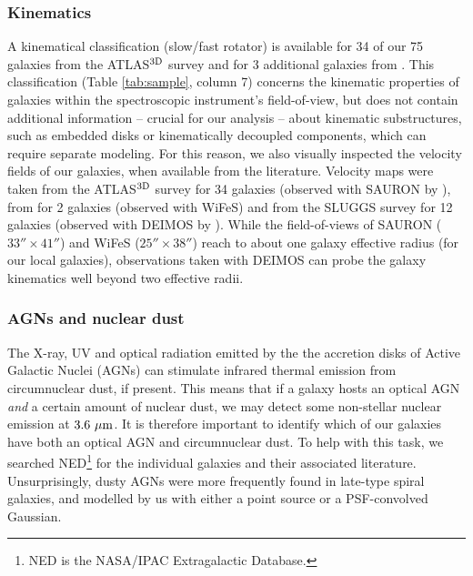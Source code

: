 \documentclass[preprint2]{emulateapj}
\begin{document}
\subsubsection{Kinematics}
\label{sec:kinem}
A kinematical classification (slow/fast rotator) is available for 34 of our 75 galaxies 
from the ATLAS$^{\rm 3D}$ survey \citep{atlas3dIII} 
and for 3 additional galaxies from \citet{scott2014}.
This classification (Table \ref{tab:sample}, column 7) 
concerns the kinematic properties of galaxies within the spectroscopic instrument's field-of-view, 
but does not contain additional information -- crucial for our analysis -- about kinematic substructures, 
such as embedded disks or kinematically decoupled components, 
which can require separate modeling.
For this reason, we also visually inspected the velocity fields of our galaxies, 
when available from the literature.
Velocity maps were taken from the ATLAS$^{\rm 3D}$ survey for 34 galaxies 
(observed with SAURON by \citealt{krajnovic2011}),
from \citet{scott2014} for 2 galaxies 
(observed with WiFeS)
and from the SLUGGS survey for 12 galaxies 
(observed with DEIMOS by \citealt{arnold2014}).
While the field-of-views of SAURON ($33'' \times 41''$) and WiFeS ($25'' \times 38''$) 
reach to about one galaxy effective radius (for our local galaxies),
observations taken with DEIMOS can probe the galaxy kinematics well beyond two effective radii.

\subsubsection{AGNs and nuclear dust}
The X-ray, UV and optical radiation 
emitted by the the accretion disks of Active Galactic Nuclei (AGNs) can stimulate infrared thermal emission 
from circumnuclear dust, if present. 
This means that if a galaxy hosts an optical AGN \emph{and} a certain amount of nuclear dust,
we may detect some non-stellar nuclear emission at $3.6~\rm \mu m$.
It is therefore important to identify which of our galaxies have both an optical AGN and circumnuclear dust.
To help with this task, we searched NED\footnote{NED is the NASA/IPAC Extragalactic Database.} 
for the individual galaxies and their associated literature.
Unsurprisingly, dusty AGNs were more frequently found in late-type spiral galaxies, 
and modelled by us with either a point source or a PSF-convolved Gaussian.
\end{document}
